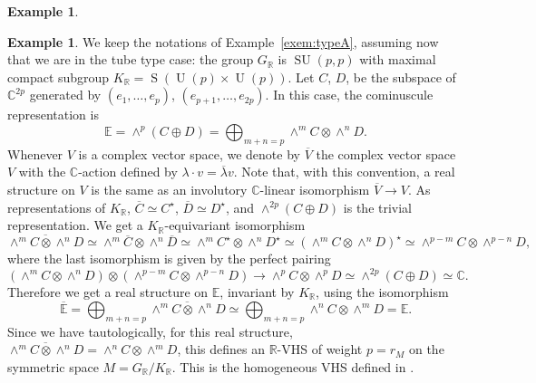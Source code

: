 \documentclass[JEP,XML,SOM,Unicode,NoFloatCountersInSection]{cedram}
\theoremstyle{plain}
\theoremstyle{definition}
\newtheorem{exem}[theo]{Example}
\let\ov\overline
\DeclareMathOperator{\rS}{S}
\DeclareMathOperator{\SU}{SU}
\DeclareMathOperator{\rU}{U}
\newcommand{\bC}{\mathbb{C}}
\newcommand{\bE}{\mathbb{E}}
\newcommand{\bR}{\mathbb{R}}
\newcommand{\rkm}{{r_M}}
\begin{document}
\begin{exem}
\begin{exem}
We keep the notations of Example~\ref{exem:typeA}, assuming now that we are in the tube type
case: the group
$G_\bR$ is $\SU(p,p)$ with maximal compact subgroup $K_\bR=\rS(\rU(p)\times\rU(p))$. Let $C$,
\resp $D$, be the subspace of $\bC^{2p}$ generated by $(e_1,\ldots,e_p)$,
\resp $(e_{p+1},\ldots,e_{2p})$. In this
case, the cominuscule representation is
$$\bE=\wedge^p(C\oplus D)=\bigoplus_{m+n=p}\wedge^m C\otimes\wedge^n D.$$
Whenever $V$ is a complex vector space, we denote by $\ov{V}$ the complex vector space
$V$ with the $\bC$-action defined by $\lambda \cdot v = \ov{\lambda}v$. Note that, with this
convention, a real structure on $V$ is the same as an involutory $\bC$-linear isomorphism
$\ov{V} \to V$.
As representations of
$K_\bR$, $\ov{C}\simeq C^\star$, $\ov{D}\simeq D^\star$, and
$\wedge^{2p}(C\oplus D)$ is
the trivial representation.
We get a $K_\bR$-equivariant isomorphism
$$
\ov{\wedge^m C \otimes \wedge^n D} \simeq \wedge^m \ov C \otimes \wedge^n \ov D
\simeq \wedge^m C^\star \otimes \wedge^n D^\star \simeq (\wedge^m C \otimes \wedge^n D)^\star
\simeq \wedge^{p-m} C \otimes \wedge^{p-n} D,
$$
where the last isomorphism is given by the perfect pairing
$$
(\wedge^m C \otimes \wedge^n D) \otimes (\wedge^{p-m}C \otimes \wedge^{p-n}D) \to
\wedge^p C \otimes \wedge^p D \simeq \wedge^{2p} (C \oplus D) \simeq \bC.
$$
Therefore we get a real
structure on $\bE$, invariant by $K_\bR$, using the isomorphism
$$\ov{\bE}=\bigoplus_{m+n=p} \ov{\wedge^m C \otimes\wedge^n D}
\simeq \bigoplus_{m+n=p} \wedge^n C\otimes\wedge^m D = \bE.$$
Since we have tautologically, for this real structure,
$\ov{\wedge^m C \otimes\wedge^n D} = \wedge^n C\otimes\wedge^m D$,
this defines an $\bR$-VHS of weight $p=\rkm$ on the symmetric space
$M=G_\bR/K_\bR$. This is the homogeneous VHS defined in \cite{Gross}.


\end{exem}
\end{exem}
\end{document}
